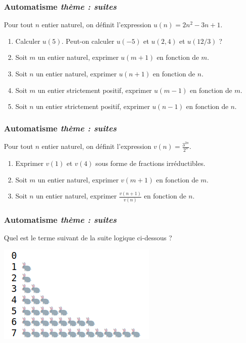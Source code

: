\documentclass[11pt]{beamer}
\newcounter{autocompteur}
\newcommand{\automatisme}[1]{\addtocounter{autocompteur}{1}\frametitle{Automatisme  \theautocompteur  \textit{ thème : #1}}}
\begin{document}
\begin{frame}
\automatisme{suites}
Pour tout $n$ entier naturel, on définit l'expression  $u(n)=2n^{2}-3n+1$.

\begin{enumerate}
\item Calculer $u(5)$. Peut-on calculer $u(-5)$ et $u(2,4)$ et $u(12/3)$ ?
\item Soit $m$ un entier naturel, exprimer $u(m+1)$ en fonction de $m$.
 \item Soit $n$ un entier naturel, exprimer $u(n+1)$ en fonction de $n$.
\item Soit $m$ un entier strictement positif, exprimer $u(m-1)$ en fonction de $m$.
 \item Soit $n$ un entier strictement positif, exprimer $u(n-1)$ en fonction de $n$.
\end{enumerate}

\end{frame}

\begin{frame}
\automatisme{suites}
Pour tout $n$ entier naturel, on définit l'expression  $v(n)=\frac{3^{2n}}{2^{n}}$.

\begin{enumerate}
\item Exprimer $v(1)$ et $v(4)$ sous forme de fractions irréductibles.
\item Soit $m$ un entier naturel, exprimer $v(m+1)$ en fonction de $m$.
\item Soit $n$ un entier naturel, exprimer $\frac{v(n+1)}{v(n)}$ en fonction de $n$.
\end{enumerate}

\end{frame}




\begin{frame}
\automatisme{suites}

Quel est le  terme suivant de la suite logique ci-dessous ?

\begin{center}
\includegraphics[scale=0.5]{ressources/fibo.png}
\end{center}
\end{frame}
\end{document}
